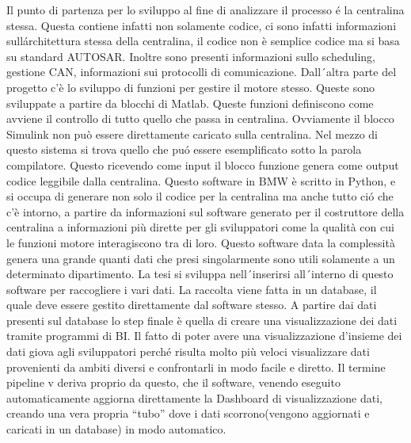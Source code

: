 \documentclass[../main.tex]{subfiles}
\begin{document}
Il punto di partenza per lo sviluppo al fine di analizzare il processo é la centralina stessa. Questa contiene infatti non solamente codice, ci sono infatti informazioni sullárchitettura stessa della centralina, il codice non è semplice codice ma si basa su standard AUTOSAR. Inoltre sono presenti informazioni sullo scheduling, gestione CAN, informazioni sui protocolli di comunicazione. Dall´altra parte del progetto c'è lo sviluppo di funzioni per gestire il motore stesso. Queste sono sviluppate a partire da blocchi di Matlab. Queste funzioni definiscono come avviene il controllo di tutto quello che passa in centralina. Ovviamente il blocco Simulink non può essere direttamente caricato sulla centralina. Nel mezzo di questo sistema si trova quello che puó essere esemplificato sotto la parola compilatore. Questo ricevendo come input il blocco funzione genera come output codice leggibile dalla centralina. Questo software in BMW è scritto in Python, e si occupa di generare non solo il codice per la centralina ma anche tutto ció che c'è intorno, a partire da informazioni sul software generato per il costruttore della centralina a informazioni più dirette per gli sviluppatori come la qualità con cui le funzioni motore interagiscono tra di loro. Questo software data la complessità genera una grande quanti dati che presi singolarmente sono utili solamente a un determinato dipartimento. La tesi si sviluppa nell´inserirsi all´interno di questo software per raccogliere i vari dati. La raccolta viene fatta in un database, il quale deve essere gestito direttamente dal software stesso. A partire dai dati presenti sul database lo step finale è quella di creare una visualizzazione dei dati tramite programmi di  BI. Il fatto di poter avere una visualizzazione d'insieme dei dati giova agli sviluppatori perché risulta molto più veloci visualizzare dati provenienti da ambiti diversi e confrontarli in modo facile e diretto. Il termine pipeline v deriva proprio da questo, che il software, venendo eseguito automaticamente aggiorna direttamente la Dashboard di visualizzazione dati, creando una vera propria “tubo” dove i dati scorrono(vengono aggiornati e caricati in un database) in modo automatico. 

\cleardoublepage
\end{document}
